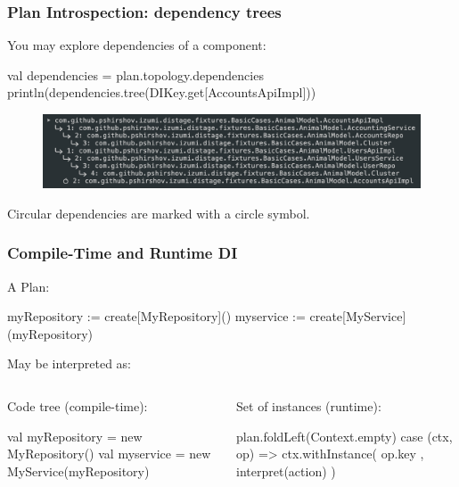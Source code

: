 \documentclass[usenames,dvipsnames]{beamer}
\begin{document}
\begin{frame}[fragile]
\frametitle{Plan Introspection: dependency trees}
You may explore dependencies of a component:

\begin{scalacode}
val dependencies = plan.topology.dependencies
println(dependencies.tree(DIKey.get[AccountsApiImpl]))
\end{scalacode}

\begin{figure}
    \includegraphics[width=\textwidth]{media/dependency-tree.png}
\end{figure}

Circular dependencies are marked with a circle symbol.
\end{frame}

\begin{frame}[fragile]
\begin{center}
\frametitle{Compile-Time and Runtime DI}
A Plan:
\begin{textcode}
myRepository := create[MyRepository]()
myservice    := create[MyService](myRepository)
\end{textcode}

May be interpreted as:

\begin{columns}

\begin{column}[T]{0.5\textwidth}
   \setlength{\topsep}{0pt}
   \setlength{\partopsep}{0pt}
Code tree (compile-time):
\begin{scalacode}
val myRepository =
    new MyRepository()
val myservice =
    new MyService(myRepository)
\end{scalacode}
\end{column}

\begin{column}[T]{0.5\textwidth}
Set of instances (runtime):
\begin{scalacode}
plan.foldLeft(Context.empty) {
case (ctx, op) =>
    ctx.withInstance(
        op.key
        , interpret(action)
    )
}
\end{scalacode}
\end{column}

\end{columns}
\end{center}
\end{frame}
\end{document}
